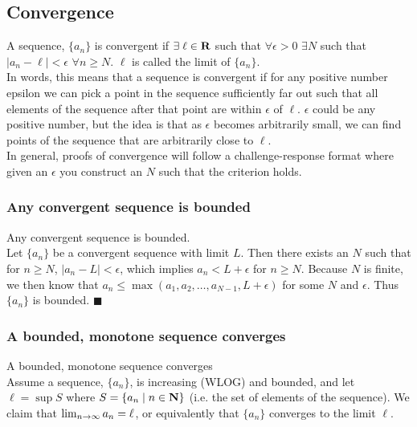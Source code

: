 \documentclass[12pt]{article}
\begin{document}
  \subsection{Convergence}
    A sequence, $\{a_n\}$ is convergent if $\exists\;\ell \in \mathbf{R}$ such that $\forall \epsilon > 0$ 
    $\exists N$ such that $|a_n - \ell| < \epsilon$ $\forall n \geq N$. $\ell$ is called the limit of $\{a_n\}$.\\
    
    In words, this means that a sequence is convergent if for any positive number epsilon we can pick a 
    point in the sequence sufficiently far out such that all elements of the sequence after that point 
    are within $\epsilon$ of $\ell$. $\epsilon$ could be any positive number, but the idea is that as 
    $\epsilon$ becomes arbitrarily small, we can find points of the sequence that are arbitrarily close 
    to $\ell$.\\

    In general, proofs of convergence will follow a challenge-response format where given an $\epsilon$
    you construct an $N$ such that the criterion holds.\\

  \subsubsection{Any convergent sequence is bounded}
    \thm Any convergent sequence is bounded.\\

    \pf Let $\{a_n\}$ be a convergent sequence with limit $L$. Then there exists an $N$ such that
    for $n \geq N$, $|a_n- L| < \epsilon$, which implies $a_n < L + \epsilon$ for $n \geq N$. Because
    $N$ is finite, we then know that $a_n \leq \max(a_1,a_2,\ldots,a_{N-1},L+\epsilon)$ for some
    $N$ and $\epsilon$. Thus $\{a_n\}$ is bounded. $\blacksquare$
  \subsubsection{A bounded, monotone sequence converges}
    \thm A bounded, monotone sequence converges\\

    \pf Assume a sequence, $\{a_n\}$, is increasing (WLOG) and bounded, and let $\ell = \sup S$ where 
    $S = \{a_n \mid n \in \mathbf{N}\}$ (i.e. the set of elements of the sequence). We claim that 
    $\lim_{n \to \infty} a_n = \ell$, or equivalently that $\{a_n\}$ converges to the limit $\ell$.\\
\end{document}
